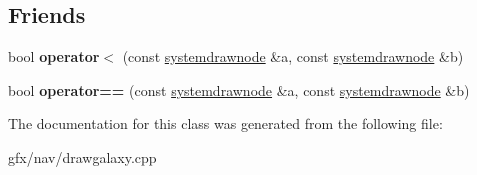 \subsection*{Friends}
\begin{DoxyCompactItemize}
\item 
bool {\bfseries operator$<$} (const \hyperlink{classsystemdrawnode}{systemdrawnode} \&a, const \hyperlink{classsystemdrawnode}{systemdrawnode} \&b)\hypertarget{classsystemdrawnode_adcd7dbdbda303eb41fbe20c7ef0d416d}{}\label{classsystemdrawnode_adcd7dbdbda303eb41fbe20c7ef0d416d}

\item 
bool {\bfseries operator==} (const \hyperlink{classsystemdrawnode}{systemdrawnode} \&a, const \hyperlink{classsystemdrawnode}{systemdrawnode} \&b)\hypertarget{classsystemdrawnode_ab2828826243c37362e790cb744c4462c}{}\label{classsystemdrawnode_ab2828826243c37362e790cb744c4462c}

\end{DoxyCompactItemize}


The documentation for this class was generated from the following file\+:\begin{DoxyCompactItemize}
\item 
gfx/nav/drawgalaxy.\+cpp\end{DoxyCompactItemize}
